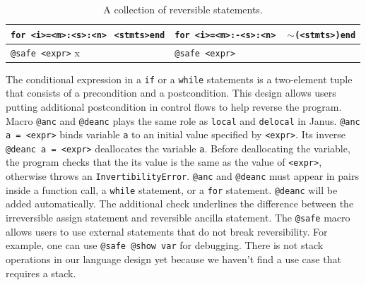 \documentclass[aps,twocolumn,longbibliography,english,superscriptaddress]{revtex4-1}
\newcommand{\<}{\langle}
\renewcommand{\>}{\rangle}
\newcommand{\cquad}{{{ }_{\quad}}}
\newcommand{\App}[1]{Appendix \ref{#1}}
\theoremstyle{definition}\newtheorem{definition}{\textit{Definition}}
\begin{document}
\begin{table}[h!]
\begin{minipage}{\columnwidth}
{\begin{tabularx}{\textwidth}{X X}
            \hline
            \texttt{for <i>=<m>:<s>:<n>}\newline $\cquad$\texttt{<stmts>}\newline \texttt{end} & \texttt{for <i>=<m>:-<s>:<n>}\newline $\cquad$ \texttt{$\sim$(<stmts>)}\newline \texttt{end}\\
            \hline
            \texttt{@safe <expr>} x & \texttt{@safe <expr>}\\
            \bottomrule
        \end{tabularx}
    }
    \caption{A collection of reversible statements.}\label{tbl:revstatements}
\end{minipage}
\end{table}


The conditional expression in a \texttt{if} or a \texttt{while} statements is a two-element tuple that consists of a precondition and a postcondition. This design allows users putting additional postcondition in control flows to help reverse the program.
Macro \texttt{@anc} and \texttt{@deanc} plays the same role as \texttt{local} and \texttt{delocal} in Janus. \texttt{@anc a = <expr>} binds variable \texttt{a} to an initial value specified by \texttt{<expr>}. Its inverse \texttt{@deanc a = <expr>} deallocates the variable \texttt{a}. Before deallocating the variable, the program checks that the its value is the same as the value of \texttt{<expr>}, otherwise throws an \texttt{InvertibilityError}. \texttt{@anc} and \texttt{@deanc} must appear in pairs inside a function call, a \texttt{while} statement, or a \texttt{for} statement.
    \texttt{@deanc} will be added automatically.
    The additional check underlines the difference between the irreversible assign statement and reversible ancilla statement.
The \texttt{@safe} macro allows users to use external statements that do not break reversibility.
For example, one can use \texttt{@safe @show var} for debugging.
There is not stack operations in our language design yet because we haven't find a use case that requires a stack.
\end{document}
